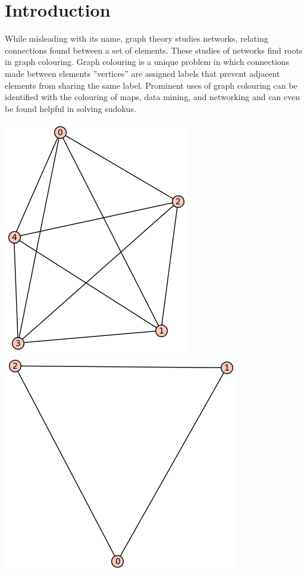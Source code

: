 \documentclass[12pt, letterpaper, twoside]{article}
\begin{document}
\clearpage

\section{Introduction}
While misleading with its name, graph theory studies networks, relating connections found between a set of elements. These studies of networks find roots in graph colouring. 
Graph colouring is a unique problem in which connections made between elements ''vertices'' are assigned labels that prevent adjacent elements from sharing the same label.
Prominent uses of graph colouring can be identified with the colouring of maps, data mining, and networking and can even be found helpful in solving sudokus.

\includegraphics[scale=.35]{test}
\includegraphics[scale=.35]{crit1}
\end{document}
